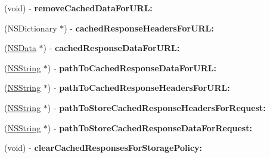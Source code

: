 \begin{DoxyCompactItemize}
\item 
\hypertarget{protocol_a_s_i_cache_delegate-p_aa2d162430d8c9bc47057030b3e305f18}{
(void) -\/ {\bfseries remove\-Cached\-Data\-For\-U\-R\-L\-:}}
\label{protocol_a_s_i_cache_delegate-p_aa2d162430d8c9bc47057030b3e305f18}

\item 
\hypertarget{protocol_a_s_i_cache_delegate-p_ab7b267fc153dcf624c91e2d07513f868}{
(\-N\-S\-Dictionary $\ast$) -\/ {\bfseries cached\-Response\-Headers\-For\-U\-R\-L\-:}}
\label{protocol_a_s_i_cache_delegate-p_ab7b267fc153dcf624c91e2d07513f868}

\item 
\hypertarget{protocol_a_s_i_cache_delegate-p_a24c0d2a6834e5a0332f3d95198fc681c}{
(\hyperlink{class_n_s_data}{\-N\-S\-Data} $\ast$) -\/ {\bfseries cached\-Response\-Data\-For\-U\-R\-L\-:}}
\label{protocol_a_s_i_cache_delegate-p_a24c0d2a6834e5a0332f3d95198fc681c}

\item 
\hypertarget{protocol_a_s_i_cache_delegate-p_a692463be3a5c9abe5a239eb761431799}{
(\hyperlink{class_n_s_string}{\-N\-S\-String} $\ast$) -\/ {\bfseries path\-To\-Cached\-Response\-Data\-For\-U\-R\-L\-:}}
\label{protocol_a_s_i_cache_delegate-p_a692463be3a5c9abe5a239eb761431799}

\item 
\hypertarget{protocol_a_s_i_cache_delegate-p_a0cab288cf23b1d6adb76981ed591d324}{
(\hyperlink{class_n_s_string}{\-N\-S\-String} $\ast$) -\/ {\bfseries path\-To\-Cached\-Response\-Headers\-For\-U\-R\-L\-:}}
\label{protocol_a_s_i_cache_delegate-p_a0cab288cf23b1d6adb76981ed591d324}

\item 
\hypertarget{protocol_a_s_i_cache_delegate-p_ab9a190279d92a9fc5d7efeff1efad0ad}{
(\hyperlink{class_n_s_string}{\-N\-S\-String} $\ast$) -\/ {\bfseries path\-To\-Store\-Cached\-Response\-Headers\-For\-Request\-:}}
\label{protocol_a_s_i_cache_delegate-p_ab9a190279d92a9fc5d7efeff1efad0ad}

\item 
\hypertarget{protocol_a_s_i_cache_delegate-p_ab7f2a212c2d6391b1d9fb7a8da9f2c39}{
(\hyperlink{class_n_s_string}{\-N\-S\-String} $\ast$) -\/ {\bfseries path\-To\-Store\-Cached\-Response\-Data\-For\-Request\-:}}
\label{protocol_a_s_i_cache_delegate-p_ab7f2a212c2d6391b1d9fb7a8da9f2c39}

\item 
\hypertarget{protocol_a_s_i_cache_delegate-p_abb2c511be4be2274bd3e812ea978e2a6}{
(void) -\/ {\bfseries clear\-Cached\-Responses\-For\-Storage\-Policy\-:}}
\label{protocol_a_s_i_cache_delegate-p_abb2c511be4be2274bd3e812ea978e2a6}


\end{DoxyCompactItemize}
